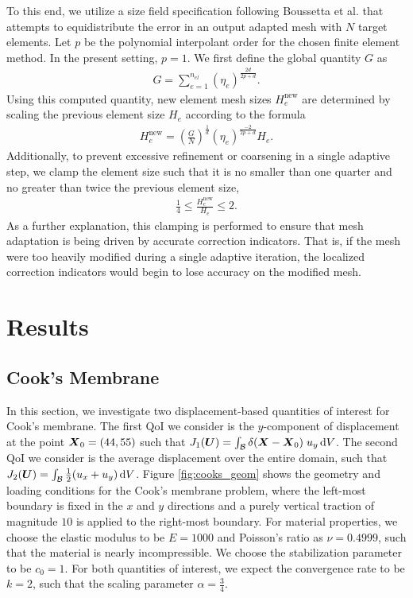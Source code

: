 To this end, we utilize a size field specification following Boussetta et al.
\cite{boussetta2006adaptive} that attempts to equidistribute the error in an
output adapted mesh with $N$ target elements. Let $p$ be the polynomial
interpolant order for the chosen finite element method. In the present
setting, $p=1$. We first define the global quantity $G$ as
%
\begin{gather}
G = \sum_{e=1}^{n_{el}} ( \eta_e ) ^{\frac{2d}{2p+d}}.
\label{eq:mech_global_size_quantity}
\end{gather}
%
Using this computed quantity, new element mesh sizes $H_e^{\text{new}}$ are
determined by scaling the previous element size $H_e$ according to the
formula
%
\begin{gather}
H_e^{\text{new}} = \left( \frac{G}{N} \right)^{\frac{1}{d}}
( \eta_e )^{\frac{-2}{2p + d}} H_e.
\label{eq:mech_size_field}
\end{gather}
%
Additionally, to prevent excessive refinement or coarsening in a single
adaptive step, we clamp the element size such that it is no smaller than
one quarter and no greater than twice the previous element size,
%
\begin{gather}
\frac14 \leq \frac{H_e^{\text{new}}}{H_e} \leq 2.
\label{eq:mech_size_clamping}
\end{gather}
%
As a further explanation, this clamping is performed to ensure that mesh
adaptation is being driven by accurate correction indicators. That is,
if the mesh were too heavily modified during a single adaptive iteration,
the localized correction indicators would begin to lose accuracy on the
modified mesh.

\section{Results}

\subsection{Cook's Membrane}

In this section, we investigate two displacement-based quantities of
interest for Cook's membrane. The first QoI we consider is
the $y$-component of displacement at the point $\boldsymbol{X}_0 = (44,55)$ such
that $J_1(\boldsymbol{U}) = \int_{\mathcal{B}} \delta(\boldsymbol{X} - \boldsymbol{X}_0) \; u_y \, \text{d} V$. 
The second QoI we consider is the average displacement
over the entire domain, such that $J_2(\boldsymbol{U}) = \int_{\mathcal{B}} \frac12 (u_x + u_y)
\, \text{d} V$. Figure \ref{fig:cooks_geom} shows the geometry and loading
conditions for the Cook's membrane problem, where the left-most boundary
is fixed in the $x$ and $y$ directions and a purely vertical traction of
magnitude $10$ is applied to the right-most boundary. For material
properties, we choose the elastic modulus to be $E=1000$ and Poisson's
ratio as $\nu = 0.4999$, such that the material is nearly incompressible.
We choose the stabilization parameter to be $c_0 = 1$. For both
quantities of interest, we expect the convergence rate to be $k = 2$, such
that the scaling parameter $\alpha = \frac34$.

